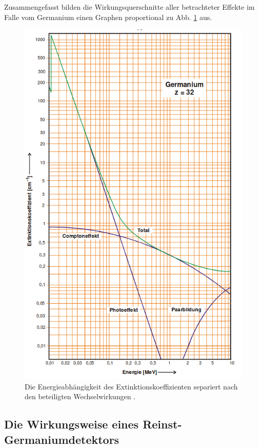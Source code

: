 Zusammengefasst bilden die Wirkungsquerschnitte aller betrachteter Effekte im Falle vom Germanium einen Graphen proportional zu Abb. \ref{fig:effekt} aus. %

\begin{figure}
	\centering
	\includegraphics[width=\linewidth-100pt,height=\textheight-100pt,keepaspectratio]{content/Images/effekt.png}
    \caption{Die Energieabhängigkeit des Extinktionskoeffizienten separiert nach den beteiligten Wechselwirkungen \cite{V18}.}
    \label{fig:effekt}
\end{figure}

\subsection{Die Wirkungsweise eines Reinst-Germaniumdetektors}


